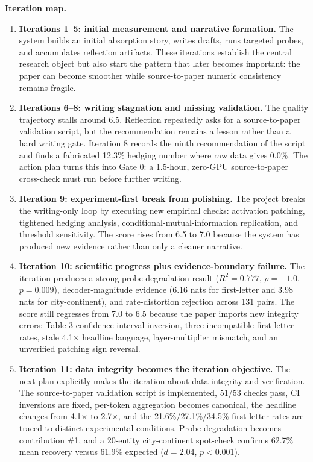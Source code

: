 \documentclass{article}
\begin{document}
\textbf{Iteration map.}
\begin{enumerate}[leftmargin=*, itemsep=2pt]
  \item \textbf{Iterations 1--5: initial measurement and narrative formation.} The system builds an initial absorption story, writes drafts, runs targeted probes, and accumulates reflection artifacts. These iterations establish the central research object but also start the pattern that later becomes important: the paper can become smoother while source-to-paper numeric consistency remains fragile.
  \item \textbf{Iterations 6--8: writing stagnation and missing validation.} The quality trajectory stalls around 6.5. Reflection repeatedly asks for a source-to-paper validation script, but the recommendation remains a lesson rather than a hard writing gate. Iteration 8 records the ninth recommendation of the script and finds a fabricated 12.3\% hedging number where raw data gives 0.0\%. The action plan turns this into Gate 0: a 1.5-hour, zero-GPU source-to-paper cross-check must run before further writing.
  \item \textbf{Iteration 9: experiment-first break from polishing.} The project breaks the writing-only loop by executing new empirical checks: activation patching, tightened hedging analysis, conditional-mutual-information replication, and threshold sensitivity. The score rises from 6.5 to 7.0 because the system has produced new evidence rather than only a cleaner narrative.
  \item \textbf{Iteration 10: scientific progress plus evidence-boundary failure.} The iteration produces a strong probe-degradation result ($R^2=0.777$, $\rho=-1.0$, $p=0.009$), decoder-magnitude evidence (6.16 nats for first-letter and 3.98 nats for city-continent), and rate-distortion rejection across 131 pairs. The score still regresses from 7.0 to 6.5 because the paper imports new integrity errors: Table 3 confidence-interval inversion, three incompatible first-letter rates, stale 4.1$\times$ headline language, layer-multiplier mismatch, and an unverified patching sign reversal.
  \item \textbf{Iteration 11: data integrity becomes the iteration objective.} The next plan explicitly makes the iteration about data integrity and verification. The source-to-paper validation script is implemented, 51/53 checks pass, CI inversions are fixed, per-token aggregation becomes canonical, the headline changes from 4.1$\times$ to 2.7$\times$, and the 21.6\%/27.1\%/34.5\% first-letter rates are traced to distinct experimental conditions. Probe degradation becomes contribution \#1, and a 20-entity city-continent spot-check confirms 62.7\% mean recovery versus 61.9\% expected ($d=2.04$, $p<0.001$).
\end{enumerate}
\end{document}
